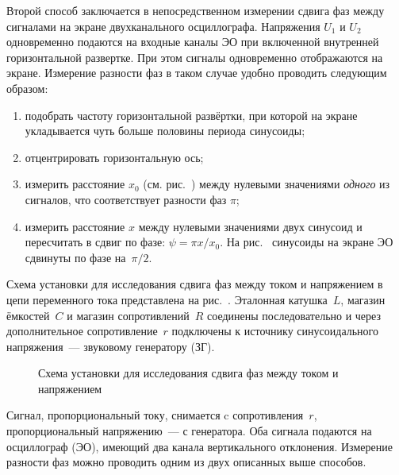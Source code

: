 Второй способ заключается в непосредственном измерении сдвига 
фаз между сигналами на экране двухканального осциллографа.
Напряжения $U_1$ и $U_2$ одновременно подаются на входные каналы ЭО
при включенной внутренней горизонтальной развертке. При этом
сигналы одновременно отображаются на экране.
Измерение разности фаз в таком случае удобно проводить следующим образом:
\begin{enumerate}[label=\arabic*),itemsep=0pt]
    \item подобрать частоту горизонтальной развёртки, при которой на экране 
    укладывается чуть больше половины периода синусоиды;
    \item отцентрировать горизонтальную ось;
    \item измерить расстояние $x_0$ (см. рис.~) между нулевыми значениями 
    \emph{одного} из сигналов, что соответствует разности фаз $\pi$;
    \item измерить расстояние $x$ между нулевыми значениями двух синусоид 
    и пересчитать в сдвиг по фазе: $\psi=\pi x/x_0$. На рис.~ 
    синусоиды на экране ЭО сдвинуты по фазе на~$\pi/2$.
\end{enumerate}

\experiment 
Схема установки для исследования сдвига фаз между током и напряжением 
в цепи переменного тока представлена на рис.~. Эталонная катушка~$L$, 
магазин ёмкостей~$C$ и магазин сопротивлений~$R$ соединены последовательно 
и через дополнительное сопротивление~$r$ подключены к источнику 
синусоидального напряжения~--- звуковому генератору (ЗГ).

\begin{figure}[hb]
    \centering
    \caption{Схема установки для исследования сдвига фаз между током и
        напряжением}
\end{figure}

Сигнал, пропорциональный току, снимается c сопротивления~$r$, 
пропорциональный напряжению~--- с генератора. Оба сигнала подаются 
на осциллограф (ЭО), имеющий два канала вертикального 
отклонения. Измерение разности фаз можно проводить одним из двух
описанных выше способов.




